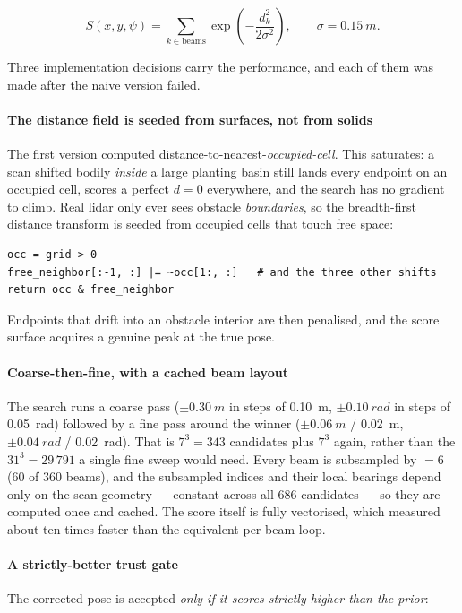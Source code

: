 \begin{equation}
S(x,y,\psi) = \sum_{k \in \text{beams}}
              \exp\!\left(-\frac{d_k^2}{2\sigma^2}\right),
\qquad \sigma = \SI{0.15}{m}.
\label{eq:likelihood}
\end{equation}

Three implementation decisions carry the performance, and each of them
was made after the naive version failed.

\paragraph{The distance field is seeded from surfaces, not from solids}
The first version computed distance-to-nearest-\emph{occupied-cell}.
This saturates: a scan shifted bodily \emph{inside} a large planting
basin still lands every endpoint on an occupied cell, scores a perfect
$d = 0$ everywhere, and the search has no gradient to climb. Real lidar
only ever sees obstacle \emph{boundaries}, so the breadth-first distance
transform is seeded from occupied cells that touch free space:

\begin{lstlisting}[style=python]
occ = grid > 0
free_neighbor[:-1, :] |= ~occ[1:, :]   # and the three other shifts
return occ & free_neighbor
\end{lstlisting}

Endpoints that drift into an obstacle interior are then penalised, and
the score surface acquires a genuine peak at the true pose.

\paragraph{Coarse-then-fine, with a cached beam layout}
The search runs a coarse pass ($\pm\SI{0.30}{m}$ in steps of
\SI{0.10}{m}, $\pm\SI{0.10}{rad}$ in steps of \SI{0.05}{rad}) followed
by a fine pass around the winner ($\pm\SI{0.06}{m}$ / \SI{0.02}{m},
$\pm\SI{0.04}{rad}$ / \SI{0.02}{rad}). That is $7^3 = 343$ candidates
plus $7^3$ again, rather than the $31^3 = 29\,791$ a single fine sweep
would need. Every beam is subsampled by  $= 6$
(60 of 360 beams), and the subsampled indices and their local bearings
depend only on the scan geometry --- constant across all 686 candidates
--- so they are computed once and cached. The score itself is fully
vectorised, which measured about ten times faster than the equivalent
per-beam loop.

\paragraph{A strictly-better trust gate}
The corrected pose is accepted \emph{only if it scores strictly higher
than the prior}:

